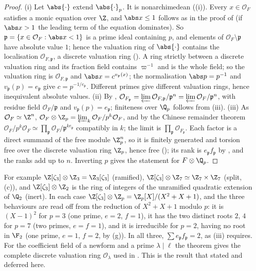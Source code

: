 \begin{proof}
(i) Let $\abs{\cdot}$ extend $\abs{\cdot}_p$. It is nonarchimedean ((i)). Every $x\in\mathcal O_F$ satisfies a monic
equation over $\Z$, and $\abs x\le1$ follows as in the proof of  (if $\abs x>1$ the leading term of the
equation dominates). So $\mathfrak p=\{x\in\mathcal O_F:\abs x<1\}$ is a prime ideal containing $p$, and elements of $\mathcal O_F\setminus\mathfrak p$ have
absolute value $1$; hence the valuation ring of $\abs{\cdot}$ contains the localisation $\mathcal O_{F,\mathfrak p}$, a discrete valuation ring
(). A ring strictly between a discrete valuation ring and its fraction field contains $\varpi^{-1}$ and is the whole field; so the
valuation ring is $\mathcal O_{F,\mathfrak p}$ and $\abs x=c^{v_{\mathfrak p}(x)}$; the normalisation $\abs p=p^{-1}$ and $v_{\mathfrak p}(p)=e_{\mathfrak p}$ give
$c=p^{-1/e_{\mathfrak p}}$. Different primes give different valuation rings, hence inequivalent absolute values.
(ii) By , $\mathcal O_{F_{\mathfrak p}}=\varprojlim\mathcal O_{F,\mathfrak p}/\mathfrak p^n=\varprojlim\mathcal O_F/\mathfrak p^n$, with residue
field $\mathcal O_F/\mathfrak p$ and $v_{\mathfrak p}(p)=e_{\mathfrak p}$; finiteness over $\Q_p$ follows from (iii).
(iii) As $\mathcal O_F\simeq\Z^n$, $\mathcal O_F\otimes\Z_p=\varprojlim_k\mathcal O_F/p^k\mathcal O_F$, and by the Chinese remainder theorem
$\mathcal O_F/p^k\mathcal O_F\simeq\prod_{\mathfrak p}\mathcal O_F/\mathfrak p^{ke_{\mathfrak p}}$ compatibly in $k$; the limit is $\prod_{\mathfrak p}\mathcal O_{F_{\mathfrak p}}$.
Each factor is a direct summand of the free module $\Z_p^n$, so it is finitely generated and torsion free over the discrete valuation ring
$\Z_p$, hence free (); its rank is $e_{\mathfrak p}f_{\mathfrak p}$ by , and the ranks add up to $n$. Inverting $p$ gives
the statement for $F\otimes\Q_p$.
\end{proof}

For example $\Z[\zeta_3]\otimes\Z_3=\Z_3[\zeta_3]$ (ramified), $\Z[\zeta_3]\otimes\Z_7\simeq\Z_7\times\Z_7$ (split, (c)), and
$\Z[\zeta_3]\otimes\Z_2$ is the ring of integers of the unramified quadratic extension of $\Q_2$ (inert). In each case
$\Z[\zeta_3]\otimes\Z_p=\Z_p[X]/(X^2+X+1)$, and the three behaviours are read off from the reduction of $X^2+X+1$ modulo $p$: it is $(X-1)^2$ for $p=3$
(one prime, $e=2$, $f=1$), it has the two distinct roots $2$, $4$ for $p=7$ (two primes, $e=f=1$), and it is irreducible for $p=2$, having no root
in $\F_2$ (one prime, $e=1$, $f=2$, by (g)). In all three, $\sum e_{\mathfrak p}f_{\mathfrak p}=2$, as (iii) requires. For the coefficient field of a newform
and a prime $\lambda\mid\ell$ the theorem gives the complete discrete valuation ring $\mathcal O_\lambda$ used in . This is
the result that  stated and deferred here.

